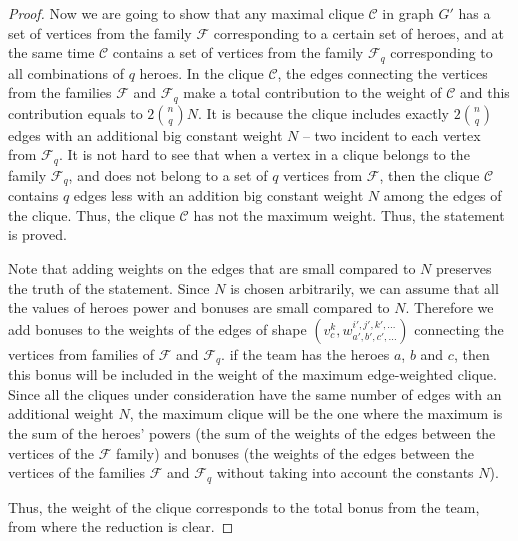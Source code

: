 \documentclass{article}
\begin{document}
\begin{proof}
     Now we are going to show that any maximal clique $\mathcal{C}$ in graph $G'$ has a set of vertices from the family $\mathcal{F}$ corresponding to a certain set of heroes, and at the same time $\mathcal{C}$ contains a set of vertices from the family $ \mathcal{F}_q $ corresponding to all combinations of $q$ heroes. In the clique $\mathcal{C}$, the edges connecting the vertices from the families $ \mathcal{F} $ and $ \mathcal{F}_q $ make a total contribution to the weight of $\mathcal{C}$ and this contribution equals to $ 2 \binom{n}{q} N $. It is because the clique includes exactly $ 2 \binom{n}{q} $ edges with an additional big constant weight $N$ -- two incident to each vertex from $ \mathcal {F}_q $.  It is not hard to see that when a vertex in a clique belongs to the family $ \mathcal{F}_q $, and does not belong to a set of $q$ vertices from $ \mathcal {F} $, then the clique $\mathcal{C}$ contains $q$ edges less with an addition big constant weight $ N $ among the edges of the clique. Thus, the clique $\mathcal{C}$ has not the maximum weight. Thus, the statement is proved. 
    
    Note that adding weights on the edges that are small compared to $N$ preserves the truth of the statement. Since $N$ is chosen arbitrarily, we can assume that all the values of heroes power and bonuses are small compared to $N$.
	Therefore we add bonuses to the weights of the edges of shape $ (v_c^{k}, w_{a', b', c', ...} ^ {i', j', k', ...}) $ connecting the vertices from families of $\mathcal{F} $ and $ \mathcal{F}_q $. if the  team has the heroes $a$, $b$ and $c$, then this bonus will be included in the weight of the maximum edge-weighted clique. Since all the cliques under consideration have the same number of edges with an additional weight $N$, the maximum clique will be the one where the maximum is the sum of the heroes' powers (the sum of the weights of the edges between the vertices of the $ \mathcal{F} $ family) and bonuses (the weights of the edges between the vertices of the families $ \mathcal{F} $ and $ \mathcal {F}_q $ without taking into account the constants $ N $).
    
Thus, the weight of the clique corresponds to the total bonus from the team, from where the reduction is clear.
    
\end{proof}

\end{document}
